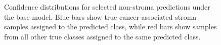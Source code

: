 \begin{figure}[htbp]
    \centering
    
    \caption{Confidence distributions for selected non-stroma predictions under
    the base model. Blue bars show true cancer-associated
    stroma samples assigned to the predicted class, while red bars show samples
    from all other true classes assigned to the same predicted class.}
    \label{fig:baseline224-nonstroma-confidence}
\end{figure}
